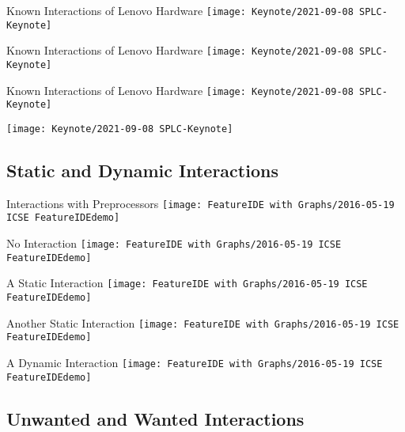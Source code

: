 \documentclass[
	aspectratio=169, %
	8pt, %
	handout, %
]{beamer}
\begin{document}
\begin{frame}{Known Interactions of Lenovo Hardware}
	\centering\texttt{[image: Keynote/2021-09-08 SPLC-Keynote]}
\end{frame}
\begin{frame}{Known Interactions of Lenovo Hardware}
	\centering\texttt{[image: Keynote/2021-09-08 SPLC-Keynote]}
\end{frame}
\begin{frame}{Known Interactions of Lenovo Hardware}
	\centering\texttt{[image: Keynote/2021-09-08 SPLC-Keynote]}
\end{frame}
\begin{frame}
	\centering\texttt{[image: Keynote/2021-09-08 SPLC-Keynote]}
\end{frame}

\subsection{Static and Dynamic Interactions}
\begin{frame}{Interactions with Preprocessors}
	\centering
	\texttt{[image: FeatureIDE with Graphs/2016-05-19 ICSE FeatureIDEdemo]}
\end{frame}
\begin{frame}{No Interaction}
	\centering
	\texttt{[image: FeatureIDE with Graphs/2016-05-19 ICSE FeatureIDEdemo]}
\end{frame}
\begin{frame}{A Static Interaction}
	\centering
	\texttt{[image: FeatureIDE with Graphs/2016-05-19 ICSE FeatureIDEdemo]}
\end{frame}
\begin{frame}{Another Static Interaction}
	\centering
	\texttt{[image: FeatureIDE with Graphs/2016-05-19 ICSE FeatureIDEdemo]}
\end{frame}
\begin{frame}{A Dynamic Interaction}
	\centering
	\texttt{[image: FeatureIDE with Graphs/2016-05-19 ICSE FeatureIDEdemo]}
\end{frame}

\subsection{Unwanted and Wanted Interactions} %
\end{document}
